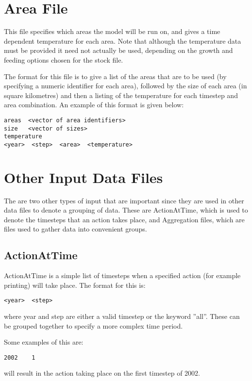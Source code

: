 \documentclass [a4paper, 10pt]{book}
\begin{document}
\section{Area File}\label{sec:areafile}
This file specifies which areas the model will be run on, and gives a time dependent temperature for each area.  Note that although the temperature data must be provided it need not actually be used, depending on the growth and feeding options chosen for the stock file.

\bigskip
The format for this file is to give a list of the areas that are to be used (by specifying a numeric identifier for each area), followed by the size of each area (in square kilometres) and then a listing of the temperature for each timestep and area combination.  An example of this format is given below:

\begin{verbatim}
areas  <vector of area identifiers>
size   <vector of sizes>
temperature
<year>  <step>  <area>  <temperature>
\end{verbatim}

\section{Other Input Data Files}\label{sec:otherinputfile}
The are two other types of input that are important since they are used in other data files to denote a grouping of data.  These are ActionAtTime, which is used to denote the timesteps that an action takes place, and Aggregation files, which are files used to gather data into convenient groups.

\subsection{ActionAtTime}
ActionAtTime is a simple list of timesteps when a specified action (for example printing) will take place.  The format for this is:

\begin{verbatim}
<year>  <step>
\end{verbatim}

where year and step are either a valid timestep or the keyword ''all''.  These can be grouped together to specify a more complex time period.\newline

Some examples of this are:
\begin{verbatim}
2002    1
\end{verbatim}
will result in the action taking place on the first timestep of 2002.
\end{document}
